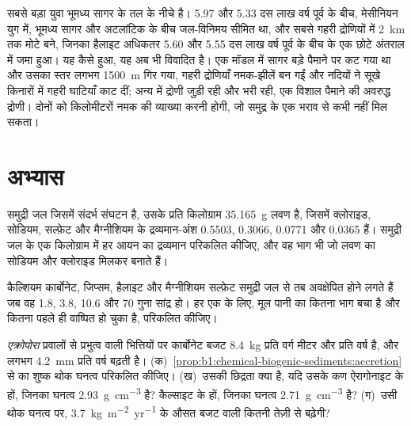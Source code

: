 सबसे बड़ा युवा  भूमध्य सागर के तल के नीचे है। 5.97 और 5.33 दस लाख वर्ष पूर्व के बीच, मेसीनियन युग में, भूमध्य सागर और अटलांटिक के बीच जल-विनिमय सीमित था, और सबसे गहरी द्रोणियों में \qty{2}{km} तक मोटे  बने, जिनका हैलाइट अधिकतर 5.60 और 5.55 दस लाख वर्ष पूर्व के बीच के एक छोटे अंतराल में जमा हुआ। यह कैसे हुआ, यह अब भी विवादित है। एक मॉडल में सागर बड़े पैमाने पर कट गया था और उसका स्तर लगभग \qty{1500}{m} गिर गया, गहरी द्रोणियाँ नमक-झीलें बन गईं और नदियों ने सूखे किनारों में गहरी घाटियाँ काट दीं; अन्य में द्रोणी जुड़ी रही और भरी रही, एक विशाल पैमाने की अवरुद्ध द्रोणी। दोनों को किलोमीटरों नमक की व्याख्या करनी होगी, जो समुद्र के एक भराव से कभी नहीं मिल सकता।

\section{अभ्यास}

\begin{exercise}[$\star$]\label{exo:b1:chemical-biogenic-sediments:1}
समुद्री जल जिसमें संदर्भ संघटन है, उसके प्रति किलोग्राम \qty{35.165}{g} लवण है, जिसमें क्लोराइड, सोडियम, सल्फ़ेट और मैग्नीशियम के द्रव्यमान-अंश 0.5503, 0.3066, 0.0771 और 0.0365 हैं। समुद्री जल के एक किलोग्राम में हर आयन का द्रव्यमान परिकलित कीजिए, और वह भाग भी जो लवण का सोडियम और क्लोराइड मिलकर बनाते हैं।
\end{exercise}

\begin{exercise}[$\star$]\label{exo:b1:chemical-biogenic-sediments:2}
कैल्शियम कार्बोनेट, जिप्सम, हैलाइट और मैग्नीशियम सल्फ़ेट समुद्री जल से तब अवक्षेपित होने लगते हैं जब वह 1.8, 3.8, 10.6 और 70 गुना सांद्र हो। हर एक के लिए, मूल पानी का कितना भाग बचा है और कितना पहले ही वाष्पित हो चुका है, परिकलित कीजिए।
\end{exercise}

\begin{exercise}[$\star$]\label{exo:b1:chemical-biogenic-sediments:3}
\emph{एक्रोपोरा} प्रवालों से प्रभुत्व वाली भित्तियों पर कार्बोनेट बजट \qty{8.4}{kg} प्रति वर्ग मीटर और प्रति वर्ष  है, और  लगभग \qty{4.2}{mm} प्रति वर्ष बढ़ती है। (क)~\cref{prop:b1:chemical-biogenic-sediments:accretion} से  का शुष्क थोक घनत्व परिकलित कीजिए। (ख)~उसकी छिद्रता क्या है, यदि उसके कण ऐरागोनाइट के हों, जिनका घनत्व \qty{2.93}{g.cm^{-3}} है? कैल्साइट के हों, जिनका घनत्व \qty{2.71}{g.cm^{-3}} है? (ग)~उसी थोक घनत्व पर, \qty{3.7}{kg.m^{-2}.yr^{-1}} के औसत बजट वाली  कितनी तेज़ी से बढ़ेगी?
\end{exercise}

